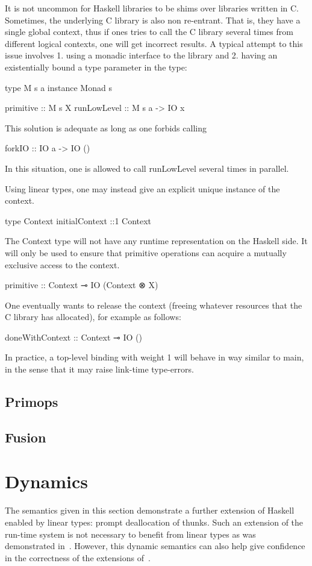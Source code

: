 \documentclass[11pt]{article}
\begin{document}
It is not uncommon for Haskell libraries to be shims over libraries
written in C. Sometimes, the underlying C library is also non
re-entrant. That is, they have a single global context, thus if ones
tries to call the C library several times from different logical
contexts, one will get incorrect results. A typical attempt to this
issue involves
1. using a monadic interface to the library and
2. having an existentially bound a type parameter in the type:

type M s a
instance Monad s

primitive :: M s X
runLowLevel :: M s a -> IO x

This solution is adequate as long as one forbids calling

forkIO :: IO a -> IO ()

In this situation, one is allowed to call runLowLevel several times in
parallel.

Using linear types, one may instead give an explicit unique instance
of the context.

type Context
initialContext ::1 Context

The Context type will not have any runtime representation on the
Haskell side.  It will only be used to ensure that primitive
operations can acquire a mutually exclusive access to the context.

primitive :: Context ⊸ IO (Context ⊗ X)

One eventually wants to release the context (freeing whatever
resources that the C library has allocated), for example as follows:

doneWithContext :: Context ⊸ IO ()

In practice, a top-level binding with weight 1 will behave in way
similar to main, in the sense that it may raise link-time type-errors.
\subsection{Primops}

\subsection{Fusion}
\label{sec:fusion}

\section{Dynamics}
\label{sec:orgheadline16}

The semantics given in this section demonstrate a further extension of
Haskell enabled by linear types: prompt deallocation of thunks. Such
an extension of the run-time system is not necessary to benefit from
linear types as was demonstrated in~\label{sec:ghc}. However, this
dynamic semantics can also help give confidence in the correctness of
the extensions of~\label{sec:ghc}.
\end{document}
